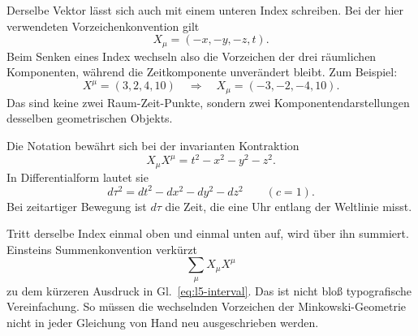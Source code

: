 \begin{classroomqa}
\end{classroomqa}

Derselbe Vektor lässt sich auch mit einem unteren Index schreiben. Bei der hier verwendeten Vorzeichenkonvention gilt
\begin{equation}
X_\mu=(-x,-y,-z,t).
\end{equation}
Beim Senken eines Index wechseln also die Vorzeichen der drei räumlichen Komponenten, während die Zeitkomponente unverändert bleibt. Zum Beispiel:
\begin{equation}
X^\mu=(3,2,4,10)
\quad\Longrightarrow\quad
X_\mu=(-3,-2,-4,10).
\end{equation}
Das sind keine zwei Raum-Zeit-Punkte, sondern zwei Komponentendarstellungen desselben geometrischen Objekts.

\begin{classroomqa}
\end{classroomqa}

Die Notation bewährt sich bei der invarianten Kontraktion
\begin{equation}
X_\mu X^\mu=t^2-x^2-y^2-z^2.
\label{eq:l5-interval}
\end{equation}
In Differentialform lautet sie
\begin{equation}
d\tau^2=dt^2-dx^2-dy^2-dz^2
\qquad (c=1).
\label{eq:l5-proper-time}
\end{equation}
Bei zeitartiger Bewegung ist \(d\tau\) die Zeit, die eine Uhr entlang der Weltlinie misst.

Tritt derselbe Index einmal oben und einmal unten auf, wird über ihn summiert. Einsteins Summenkonvention verkürzt
\begin{equation}
\sum_{\mu}X_\mu X^\mu
\end{equation}
zu dem kürzeren Ausdruck in Gl.~\eqref{eq:l5-interval}. Das ist nicht bloß typografische Vereinfachung. So müssen die wechselnden Vorzeichen der Minkowski-Geometrie nicht in jeder Gleichung von Hand neu ausgeschrieben werden.

